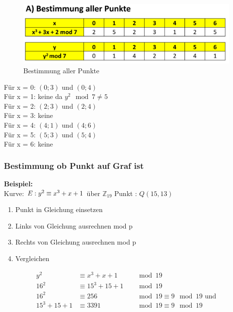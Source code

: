\documentclass[12pt]{scrartcl}
\begin{document}
\begin{figure}[ht]
    \centering
    \includegraphics[width=\textwidth]{img/bestimung_aller_punkte.png}
    \caption{Bestimmung aller Punkte}
    \label{fig:bestimmung_aller_punkte}
\end{figure}

Für x = 0: $(0; 3)$ und $(0; 4)$ \\
Für x = 1: keine da $y^2 \mod 7 \neq 5$ \\
Für x = 2: $(2; 3)$ und $(2; 4)$ \\
Für x = 3: keine \\
Für x = 4: $(4; 1)$ und $(4; 6)$ \\
Für x = 5: $(5; 3)$ und $(5; 4)$ \\
Für x = 6: keine \\



\newpage 
\subsubsection{Bestimmung ob Punkt auf Graf ist}

\textbf{Beispiel:}\\

Kurve: $E: \space y^2 \equiv x^3 + x + 1$ über $\mathbb{Z}_{19}$
Punkt : $Q(15, 13)$

\begin{enumerate}
    \item Punkt in Gleichung einsetzen
    \item Links von Gleichung ausrechnen mod p
    \item Rechts von Gleichung ausrechnen mod p
    \item Vergleichen
\end{enumerate}

\begin{align}
    y^2 &\equiv x^3 + x + 1 &&\mod 19 \\
    16^2 &\equiv 15^3 + 15 + 1 &&\mod 19 \\
    16^2 &\equiv 256 &&\mod 19 \equiv 9 \mod 19 \text{ und} \\
    15^3 + 15 + 1 &\equiv 3391 &&\mod 19 \equiv 9 \mod 19
\end{align}
\end{document}
